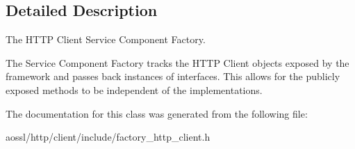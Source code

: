 \subsection{Detailed Description}
The H\+T\+TP Client Service Component Factory. 

The Service Component Factory tracks the H\+T\+TP Client objects exposed by the framework and passes back instances of interfaces. This allows for the publicly exposed methods to be independent of the implementations. 

The documentation for this class was generated from the following file\+:\begin{DoxyCompactItemize}
\item 
aossl/http/client/include/factory\+\_\+http\+\_\+client.\+h\end{DoxyCompactItemize}
